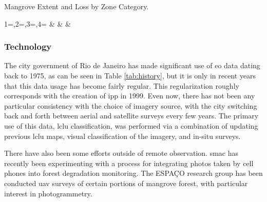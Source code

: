\begin{table}[!htb]\centering
	\caption[Mangrove Extent and Loss by Zone Category]{Mangrove Extent and Loss by Zone Category.} \label{tab:loss_area_zone}
	\fontsize{8}{10}\selectfont
		{1=\year,2=\type,3=\platform,4=\agency}
		{\textbf{\year} & \type & \platform & \agency}
\end{table}



%


\subsubsection{Technology} \label{sec:rio-evdt-tech-results}

The city government of Rio de Janeiro has made significant use of \ac{eo} data dating back to 1975, as can be seen in Table \ref{tab:history}, but it is only in recent years that this data usage has become fairly regular. This regularization roughly corresponds with the creation of \ac{ipp} in 1999. Even now, there has not been any particular consistency with the choice of imagery source, with the city switching back and forth between aerial and satellite surveys every few years. The primary use of this data, \acf{lclu} classification, was performed via a combination of updating previous \ac{lclu} maps, visual classification of the imagery, and in-situ surveys.

There have also been some efforts outside of remote observation. \ac{smac} has recently been experimenting with a process for integrating photos taken by cell phones into forest degradation monitoring. The ESPAÇO research group has been conducted \ac{uav} surveys of certain portions of mangrove forest, with particular interest in photogrammetry. 

